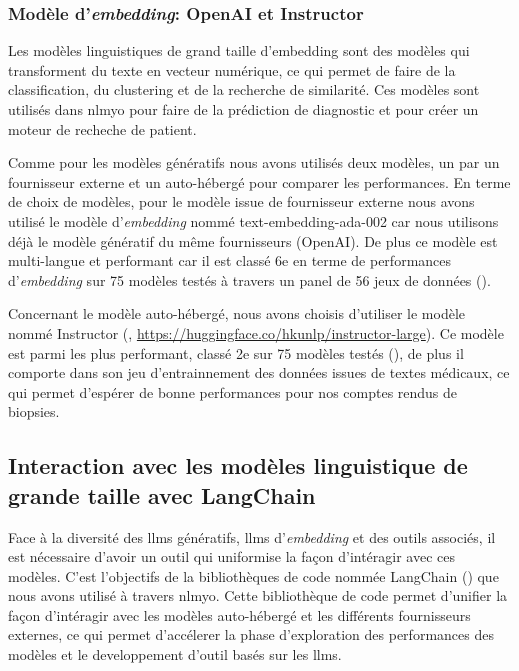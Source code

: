 \subsubsection{Modèle d'\textit{embedding}: OpenAI et Instructor}
Les modèles linguistiques de grand taille d'embedding sont des modèles qui transforment du texte en vecteur numérique, ce qui permet de faire de la classification, du clustering et de la recherche de similarité. Ces modèles sont utilisés dans \gls{nlmyo} pour faire de la prédiction de diagnostic et pour créer un moteur de recheche de patient.

Comme pour les modèles  génératifs nous avons utilisés deux modèles, un par un fournisseur externe et un auto-hébergé pour comparer les performances. En terme de choix de modèles, pour le modèle issue de fournisseur externe nous avons utilisé le modèle d'\textit{embedding} nommé text-embedding-ada-002 car nous utilisons déjà le modèle génératif du même fournisseurs (OpenAI). De plus ce modèle est multi-langue et performant car il est classé 6e en terme de performances d'\textit{embedding} sur 75 modèles testés à travers un panel de 56 jeux de données (\cite{muennighoff_mteb_2022}).

Concernant le modèle auto-hébergé, nous avons choisis d'utiliser le modèle nommé Instructor (\cite{su_one_2023}, \href{https://huggingface.co/hkunlp/instructor-large}{https://huggingface.co/hkunlp/instructor-large}). Ce modèle est parmi les plus performant, classé 2e sur 75 modèles testés (\cite{muennighoff_mteb_2022}), de plus il comporte dans son jeu d'entrainnement des données issues de textes médicaux, ce qui permet d'espérer de bonne performances pour nos comptes rendus de biopsies. 

\subsection{Interaction avec les modèles linguistique de grande taille avec LangChain}

Face à la diversité des \gls{llms} génératifs, \gls{llms} d'\textit{embedding} et des outils associés, il est nécessaire d'avoir un outil qui uniformise la façon d'intéragir avec ces modèles. C'est l'objectifs de la bibliothèques de code nommée LangChain (\cite{chase_harrison_langchain_2022}) que nous avons utilisé à travers \gls{nlmyo}. Cette bibliothèque de code permet d'unifier la façon d'intéragir avec les modèles auto-hébergé et les différents fournisseurs externes, ce qui permet d'accélerer la phase d'exploration des performances des modèles et le developpement d'outil basés sur les \gls{llms}. 

